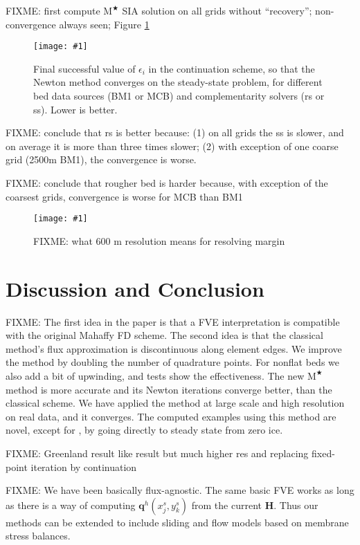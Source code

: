 \documentclass[twocolumn,letterpaper]{igs}
\newcommand{\onecol}[1]{\texttt{[image: \#1]}}
\newcommand\bq{\mathbf{q}}
\newcommand\bH{\mathbf{H}}
\newcommand\eps{\epsilon}
\newcommand{\Mstar}{$\text{M}^{\bigstar}$\xspace}
\begin{document}
FIXME: first compute \Mstar SIA solution on all grids without ``recovery''; non-convergence always seen; Figure \ref{fig:grnrobusteps}

\begin{figure}[ht]
\onecol{grnrobusteps.pdf}
\caption{Final successful value of $\eps_i$ in the continuation scheme, so that the Newton method converges on the steady-state problem, for different bed data sources (BM1 or MCB) and complementarity solvers (rs or ss).  Lower is better.}
\label{fig:grnrobusteps}
\end{figure}

FIXME: conclude that rs is better because:
(1) on all grids the ss is slower, and on average it is more than three times slower; (2) with exception of one coarse grid (2500m BM1), the convergence is worse.

FIXME: conclude that rougher bed is harder because, with exception of the coarsest grids, convergence is worse for MCB than BM1

\begin{figure}[ht]
\onecol{grnwinset.pdf} %
\caption{FIXME: what 600 m resolution means for resolving margin}
\label{fig:grnmargindetail}
\end{figure}



\section{Discussion and Conclusion} \label{sec:conclusion}

FIXME: The first idea in the paper is that a FVE interpretation is compatible with the original Mahaffy FD scheme.  The second idea is that the classical method's flux approximation is discontinuous along element edges.  We improve the method by doubling the number of quadrature points.  For nonflat beds we also add a bit of upwinding, and tests show the effectiveness.  The new \Mstar method is more accurate and its Newton iterations converge better, than the classical scheme.  We have applied the method at large scale and high resolution on real data, and it converges.  The computed examples using this method are novel, except for \cite{JouvetBueler2012}, by going directly to steady state from zero ice.

FIXME: Greenland result like \cite{JouvetBueler2012} result but much higher res and replacing fixed-point iteration by continuation 

FIXME: We have been basically flux-agnostic.  The same basic FVE works as long as there is a way of computing $\bq^h(x_j^s,y_k^s)$ from the current $\bH$.  Thus our methods can be extended to include sliding and flow models based on membrane stress balances. 
\end{document}
